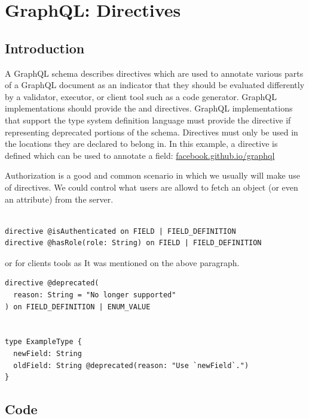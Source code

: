 \documentclass[]{book}
\begin{document}
\chapter{GraphQL: Directives}\label{graphql-directives}

\section{Introduction}\label{introduction-4}

A GraphQL schema describes directives which are used to annotate various
parts of a GraphQL document as an indicator that they should be
evaluated differently by a validator, executor, or client tool such as a
code generator. GraphQL implementations should provide the \citet{skip}
and \citet{include} directives. GraphQL implementations that support the
type system definition language must provide the \citet{deprecated}
directive if representing deprecated portions of the schema. Directives
must only be used in the locations they are declared to belong in. In
this example, a directive is defined which can be used to annotate a
field:
\href{https://facebook.github.io/graphql/draft/\#sec-Type-System.Directives}{facebook.github.io/graphql}

Authorization is a good and common scenario in which we usually will
make use of directives. We could control what users are allowd to fetch
an object (or even an attribute) from the server.

\begin{verbatim}

directive @isAuthenticated on FIELD | FIELD_DEFINITION
directive @hasRole(role: String) on FIELD | FIELD_DEFINITION

\end{verbatim}

or for clients tools as It was mentioned on the above paragraph.

\begin{verbatim}
directive @deprecated(
  reason: String = "No longer supported"
) on FIELD_DEFINITION | ENUM_VALUE


type ExampleType {
  newField: String
  oldField: String @deprecated(reason: "Use `newField`.")
}
\end{verbatim}

\section{Code}\label{code-3}
\end{document}

